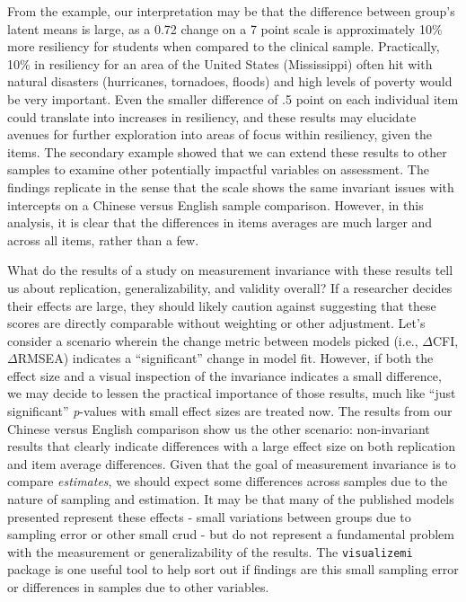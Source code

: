 \documentclass[
  man]{apa7}
\begin{document}
From the example, our interpretation may be that the difference between group's latent means is large, as a 0.72 change on a 7 point scale is approximately 10\% more resiliency for students when compared to the clinical sample. Practically, 10\% in resiliency for an area of the United States (Mississippi) often hit with natural disasters (hurricanes, tornadoes, floods) and high levels of poverty would be very important. Even the smaller difference of .5 point on each individual item could translate into increases in resiliency, and these results may elucidate avenues for further exploration into areas of focus within resiliency, given the items. The secondary example showed that we can extend these results to other samples to examine other potentially impactful variables on assessment. The findings replicate in the sense that the scale shows the same invariant issues with intercepts on a Chinese versus English sample comparison. However, in this analysis, it is clear that the differences in items averages are much larger and across all items, rather than a few.

What do the results of a study on measurement invariance with these results tell us about replication, generalizability, and validity overall? If a researcher decides their effects are large, they should likely caution against suggesting that these scores are directly comparable without weighting or other adjustment. Let's consider a scenario wherein the change metric between models picked (i.e., \(\Delta\)CFI, \(\Delta\)RMSEA) indicates a ``significant'' change in model fit. However, if both the effect size and a visual inspection of the invariance indicates a small difference, we may decide to lessen the practical importance of those results, much like ``just significant'' \emph{p}-values with small effect sizes are treated now. The results from our Chinese versus English comparison show us the other scenario: non-invariant results that clearly indicate differences with a large effect size on both replication and item average differences. Given that the goal of measurement invariance is to compare \emph{estimates}, we should expect some differences across samples due to the nature of sampling and estimation. It may be that many of the published models presented represent these effects - small variations between groups due to sampling error or other small crud - but do not represent a fundamental problem with the measurement or generalizability of the results. The \texttt{visualizemi} package is one useful tool to help sort out if findings are this small sampling error or differences in samples due to other variables.
\end{document}

